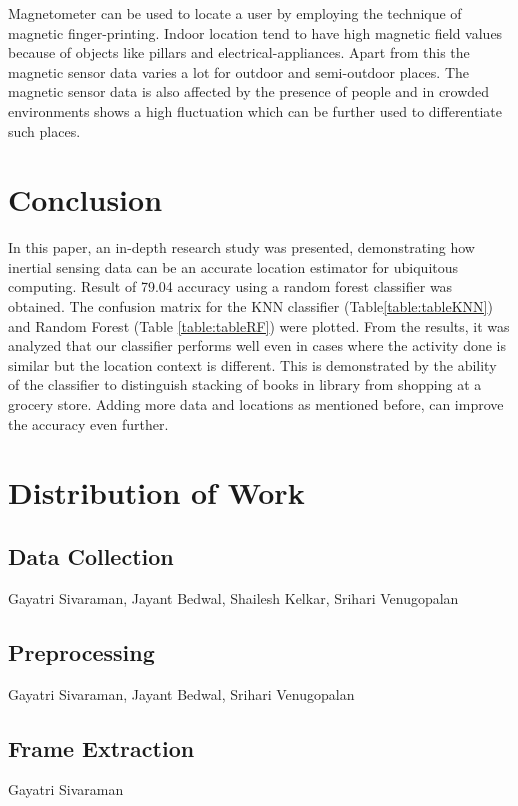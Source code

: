 \documentclass{acm_proc_article-sp}
\begin{document}
Magnetometer can be used to locate a user by employing the technique of magnetic finger-printing. Indoor location tend to have high magnetic field values because of objects like pillars and electrical-appliances\cite{Tachikawa:2016:PLS:2971648.2971684}\cite{Wang:2012:NNW:2307636.2307655}. Apart from this the magnetic sensor data varies a lot for outdoor and semi-outdoor places. The magnetic sensor data is also affected by the presence of people and in crowded environments shows a high fluctuation\cite{Zhang:2011:FSF:2318776.2318798} which can be further used to differentiate such places.

\section{Conclusion}
In this paper, an in-depth research study was presented, demonstrating how inertial sensing data can be an accurate location estimator for ubiquitous computing. Result of 79.04\textsc{} accuracy using a random forest classifier was obtained. The confusion matrix for the KNN classifier (Table\ref{table:tableKNN}) and Random Forest (Table \ref{table:tableRF}) were plotted. From the results, it was analyzed that our classifier performs well even in cases where the activity done is similar but the location context is different. This is demonstrated by the ability of the classifier to distinguish stacking of books in library from shopping at a grocery store. Adding more data and locations as mentioned before, can improve the accuracy even further.




\appendix
\section{Distribution of Work}
\subsection{Data Collection}
Gayatri Sivaraman, Jayant Bedwal, Shailesh Kelkar, Srihari Venugopalan
\subsection{Preprocessing}
Gayatri Sivaraman, Jayant Bedwal, Srihari Venugopalan
\subsection{Frame Extraction}
Gayatri Sivaraman
\end{document}
